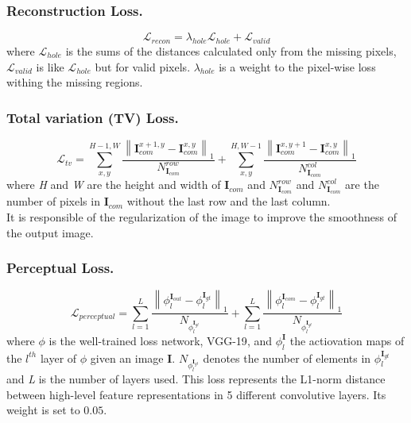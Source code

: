 \documentclass[10pt,twocolumn,letterpaper]{article}
\newcommand\norm[1]{\left\lVert#1\right\rVert}
\begin{document}
\subsubsection{Reconstruction Loss.}
\begin{dmath}
    \mathcal{L}_{recon} = \lambda_{hole} \mathcal{L}_{hole} + \mathcal{L}_{valid}
\end{dmath}
where \(\mathcal{L}_{hole}\) is the sums of the distances calculated only from the missing pixels, \(\mathcal{L}_{valid}\) is like \(\mathcal{L}_{hole}\) but for valid pixels. \(\lambda_{hole}\) is a weight to the pixel-wise loss withing the missing regions.

\subsubsection{Total variation (TV) Loss.}
\begin{dmath}
    \mathcal{L}_{tv} = \sum^{H-1,W}_{x,y} \frac{\norm{ \mathbf{I}^{x+1,y}_{com} - \mathbf{I}^{x,y}_{com} }_1}{N^{row}_{\mathbf{I}_{com}}} + \sum^{H,W-1}_{x,y} \frac{\norm{ \mathbf{I}^{x,y+1}_{com} - \mathbf{I}^{x,y}_{com} }_1}{N^{col}_{\mathbf{I}_{com}}}
\end{dmath}
where \textit{H} and \textit{W} are the height and width of $\mathbf{I}_{com}$ and $N^{row}_{\mathbf{I}_{com}}$ and $N^{col}_{\mathbf{I}_{com}}$ are the number of pixels in $\mathbf{I}_{com}$ without the last row and the last column.
\\
It is responsible of the regularization of the image to improve the smoothness of the output image.

\subsubsection{Perceptual Loss.}
\begin{dmath}
    \mathcal{L}_{perceptual} = \sum^L_{l=1} \frac{\norm{ \phi^{\mathbf{I}_{out}}_l - \phi^{\mathbf{I}_{gt}}_l }_1}{N_{\phi^{\mathbf{I}_{gt}}_l}} + \sum^L_{l=1} \frac{\norm{ \phi^{\mathbf{I}_{com}}_l - \phi^{\mathbf{I}_{gt}}_l }_1}{N_{\phi^{\mathbf{I}_{gt}}_l}}
\end{dmath}
where \(\phi\) is the well-trained loss network, VGG-19\cite{simonyan2014very}, and \(\phi^{\mathbf{I}}_l\) the actiovation maps of the \(l^{th}\) layer of \(\phi\) given an image \(\mathbf{I}\).
\(N_{\phi^{\mathbf{I}_{gt}}_l}\) denotes the number of elements in \(\phi^{\mathbf{I}_{gt}}_l\) and \textit{L} is the number of layers used.
This loss represents the L1-norm distance between high-level feature representations in 5 different convolutive layers. Its weight is set to \(0.05\).
\end{document}
